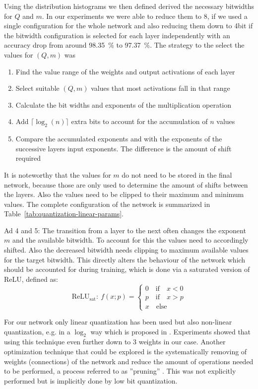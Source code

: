 Using the distribution histograms we then defined derived the necessary bitwidths for $Q$ and $m$. In our experiments we were able to reduce them to \SI{8}{\bit}, if we used a single configuration for the whole network and also reducing them down to 4bit if the bitwidth configuration is selected for each layer independently with an accuracy drop from around \SI{98.35}{\percent} to \SI{97.37}{\percent}. The strategy to the select the values for $(Q,m)$ was
\begin{enumerate}
	\item Find the value range of the weights and output activations of each layer
	\item Select suitable $(Q,m)$ values that most activations fall in that range
	\item Calculate the bit widths and exponents of the multiplication operation
	\item Add $\lceil \log_2(n) \rceil$ extra bits to account for the accumulation of $n$ values
	\item Compare the accumulated exponents and with the exponents of the successive layers input exponents. The difference is the amount of shift required
\end{enumerate}
It is noteworthy that the values for $m$ do not need to be stored in the final network, because those are only used to determine the amount of shifts between the layers. Also the values need to be clipped to their maximum and minimum values. The complete configuration of the network is summarized in Table~\ref{tab:quantization-linear-params}.

Ad 4 and 5: The transition from a layer to the next often changes the exponent $m$ and the available bitwidth. To account for this the values need to accordingly shifted. Also the decreased bitwidth needs clipping to maximum available values for the target bitwidth. This directly alters the behaviour of the network which should be accounted for during training, which is done via a saturated version of ReLU, defined as:
\begin{equation}
    \text{ReLU}_{\text{sat}}: ~ f(x;p) = \begin{cases}
		0 	\quad \text{if} \quad x < 0 \\
		p 	\quad \text{if} \quad x > p \\
		x	\quad \text{else}
	\end{cases}
\end{equation}

For our network only linear quantization has been used but also non-linear quantization, e.g. in a $\log_2$ way which is proposed in \cite{Lee:2017aa}. Experiments showed that using this technique even further down to \SI{3}{\bit} weights in our case.
Another optimization technique that could be explored is the systematically removing of weights (connections) of the network and reduce the amount of operations needed to be performed, a process referred to as ''pruning'' \cite{Zhu:2017aa}. This was not explicitly performed but is implicitly done by low bit quantization.

